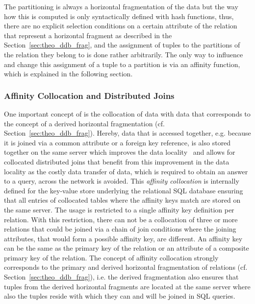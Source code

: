 The partitioning is always a horizontal fragmentation of the data but the way how this is computed is only syntactically defined with hash functions, thus,
there are no explicit selection conditions on a certain attribute of the relation that represent a horizontal fragment as described in the
Section~\ref{sec:theo_ddb_frag}, and the assignment of tuples to the partitions of the relation they belong to is done rather arbitrarily. The only way to
influence and change this assignment of a tuple to a partition is via an affinity function, which is explained in the following section.



\subsubsection{Affinity Collocation and Distributed Joins}
\label{sec:meth_ign_affc}

One important concept of  is the collocation of data with data that corresponds to the concept of a derived horizontal fragmentation 
(cf. Section~\ref{sec:theo_ddb_frag}). Hereby, data that is accessed together, e.g. because it is joined via a common attribute or a foreign key reference,
is also stored together on the same server which improves the data locality~\citep{Wiese2014} and allows for collocated distributed joins that benefit from
this improvement in the data locality as the costly data transfer of data, which is required to obtain an answer to a query, across the network is 
avoided. This \emph{affinity collocation} is internally defined for the key-value store underlying the relational SQL database ensuring that all entries 
of collocated tables where the affinity keys match are stored on the same server. The usage is restricted to a single affinity key definition per 
relation. With this restriction, there can not be a collocation of three or more relations that could be joined via a chain of join conditions where the
joining attributes, that would form a possible affinity key, are different. An affinity key can be the same as the primary key of the relation or an 
attribute of a composite primary key of the relation. The concept of affinity collocation strongly corresponds to the primary and derived horizontal
fragmentation of relations (cf. Section~\ref{sec:theo_ddb_frag}), i.e. the derived fragmentation also ensures that tuples from the derived horizontal 
fragments are located at the same server where also the tuples reside with which they can and will be joined in SQL queries.

